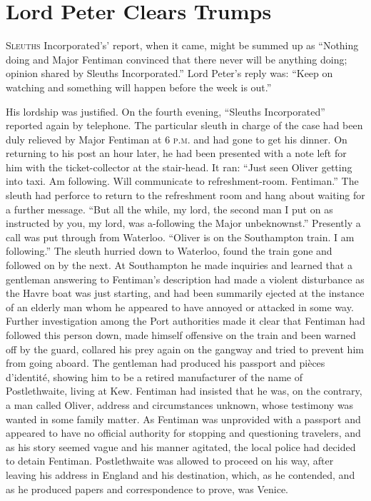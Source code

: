 \chapter{Lord Peter Clears Trumps}
\lettrine[lines=4,ante=‘]{S}{leuths} Incorporated's' report, when it came, might be summed up as \enquote{Nothing doing and Major Fentiman convinced that there never will be anything doing; opinion shared by Sleuths Incorporated.} Lord Peter's reply was: \enquote{Keep on watching and something will happen before the week is out.}

His lordship was justified. On the fourth evening, \enquote{Sleuths Incorporated} reported again by telephone. The particular sleuth in charge of the case had been duly relieved by Major Fentiman at 6 \textsc{p.m.} and had gone to get his dinner. On returning to his post an hour later, he had been presented with a note left for him with the ticket-collector at the stair-head. It ran: \enquote{Just seen Oliver getting into taxi. Am following. Will communicate to refreshment-room. Fentiman.} The sleuth had perforce to return to the refreshment room and hang about waiting for a further message. \enquote{But all the while, my lord, the second man I put on as instructed by you, my lord, was a-following the Major unbeknownst.} Presently a call was put through from Waterloo. \enquote{Oliver is on the Southampton train. I am following.} The sleuth hurried down to Waterloo, found the train gone and followed on by the next. At Southampton he made inquiries and learned that a gentleman answering to Fentiman's description had made a violent disturbance as the Havre boat was just starting, and had been summarily ejected at the instance of an elderly man whom he appeared to have annoyed or attacked in some way. Further investigation among the Port authorities made it clear that Fentiman had followed this person down, made himself offensive on the train and been warned off by the guard, collared his prey again on the gangway and tried to prevent him from going aboard. The gentleman had produced his passport and pièces d'identité, showing him to be a retired manufacturer of the name of Postlethwaite, living at Kew. Fentiman had insisted that he was, on the contrary, a man called Oliver, address and circumstances unknown, whose testimony was wanted in some family matter. As Fentiman was unprovided with a passport and appeared to have no official authority for stopping and questioning travelers, and as his story seemed vague and his manner agitated, the local police had decided to detain Fentiman. Postlethwaite was allowed to proceed on his way, after leaving his address in England and his destination, which, as he contended, and as he produced papers and correspondence to prove, was Venice.

